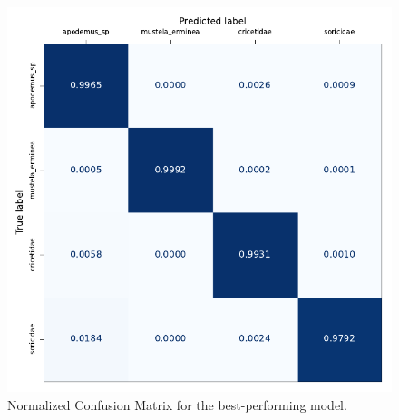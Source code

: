     

    \begin{figure}[ht]
    \centering
    \includegraphics{figures/conf_matrix_best.pdf}
    \caption{Normalized Confusion Matrix for the best-performing model.}
    \label{fig:conf_matrix_best}
    \end{figure}
